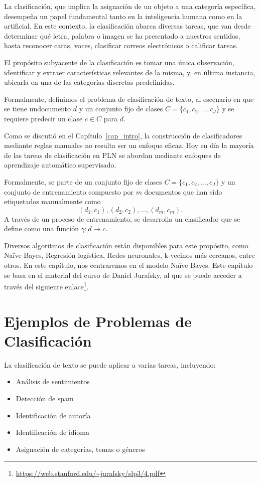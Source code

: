 La clasificación, que implica la asignación de un objeto a una categoría específica, desempeña un papel fundamental tanto en la inteligencia humana como en la artificial. En este contexto, la clasificación abarca diversas tareas, que van desde determinar qué letra, palabra o imagen se ha presentado a nuestros sentidos, hasta reconocer caras, voces, clasificar correos electrónicos o calificar tareas.

El propósito subyacente de la clasificación es tomar una única observación, identificar y extraer características relevantes de la misma, y, en última instancia, ubicarla en una de las categorías discretas predefinidas.

\begin{definition}
Formalmente, definimos el problema de clasificación de texto, al escenario en que se tiene undocumento $d$ y un conjunto fijo de clases $C = \{c_1, c_2, \ldots, c_J\}$ y se requiere predecir un clase  $c \in C$ para $d$.
\end{definition}

Como se discutió en el Capítulo~\ref{cap_intro}, la construcción de clasificadores mediante reglas manuales no resulta ser un enfoque eficaz. Hoy en día la mayoría de las tareas de clasificación en PLN se abordan mediante enfoques de aprendizaje automático supervisado.

Formalmente, se parte de un conjunto fijo de clases $C = \{c_1, c_2, \ldots, c_J\}$ y un conjunto de entrenamiento compuesto por $m$ documentos que han sido etiquetados manualmente como
\[
(d_1, c_1), (d_2, c_2), \ldots, (d_m, c_m).
\]
A través de un proceso de entrenamiento, se desarrolla un clasificador que se define como una función $\gamma: d \to c$.

Diversos algoritmos de clasificación están disponibles para este propósito, como Naïve Bayes, Regresión logística, Redes neuronales, k-vecinos más cercanos, entre otros. En este capítulo, nos centraremos en el modelo Naïve Bayes. Este capítulo se basa en el material del curso de Daniel Jurafsky, al que se puede acceder a través del siguiente enlace\footnote{\url{https://web.stanford.edu/~jurafsky/slp3/4.pdf}}.

\section{Ejemplos de Problemas de Clasificación}
La clasificación de texto se puede aplicar a varias tareas, incluyendo:

\begin{itemize}
    \item Análisis de sentimientos
    \item Detección de spam
    \item Identificación de autoría
    \item Identificación de idioma
    \item Asignación de categorías, temas o géneros
\end{itemize}

